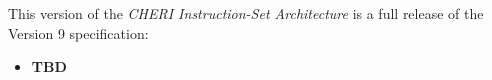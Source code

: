 This version of the \textit{CHERI Instruction-Set Architecture} is a full
release of the Version 9 specification:

\begin{itemize}
\item \textbf{TBD}
\end{itemize}
